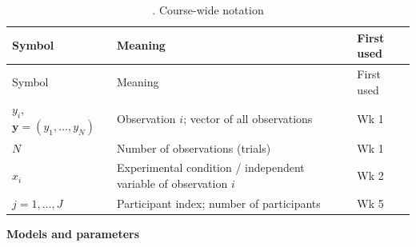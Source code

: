 \begin{longtable}[]{@{}
  >{\raggedright\arraybackslash}p{}
  >{\raggedright\arraybackslash}p{}
  >{\raggedright\arraybackslash}p{}@{}}
\caption{. Course-wide notation}\tabularnewline
\toprule\noalign{}
\begin{minipage}[b]{\linewidth}\raggedright
Symbol
\end{minipage} & \begin{minipage}[b]{\linewidth}\raggedright
Meaning
\end{minipage} & \begin{minipage}[b]{\linewidth}\raggedright
First used
\end{minipage} \\
\midrule\noalign{}
\endfirsthead
\toprule\noalign{}
\begin{minipage}[b]{\linewidth}\raggedright
Symbol
\end{minipage} & \begin{minipage}[b]{\linewidth}\raggedright
Meaning
\end{minipage} & \begin{minipage}[b]{\linewidth}\raggedright
First used
\end{minipage} \\
\midrule\noalign{}
\endhead
\bottomrule\noalign{}
\endlastfoot
\(y_i\), \(\mathbf{y} = (y_1,\dots,y_N)\) & Observation \(i\); vector of
all observations & Wk 1 \\
\(N\) & Number of observations (trials) & Wk 1 \\
\(x_i\) & Experimental condition / independent variable of observation
\(i\) & Wk 2 \\
\(j = 1,\dots,J\) & Participant index; number of participants & Wk 5 \\
\end{longtable}

\textbf{Models and parameters}

